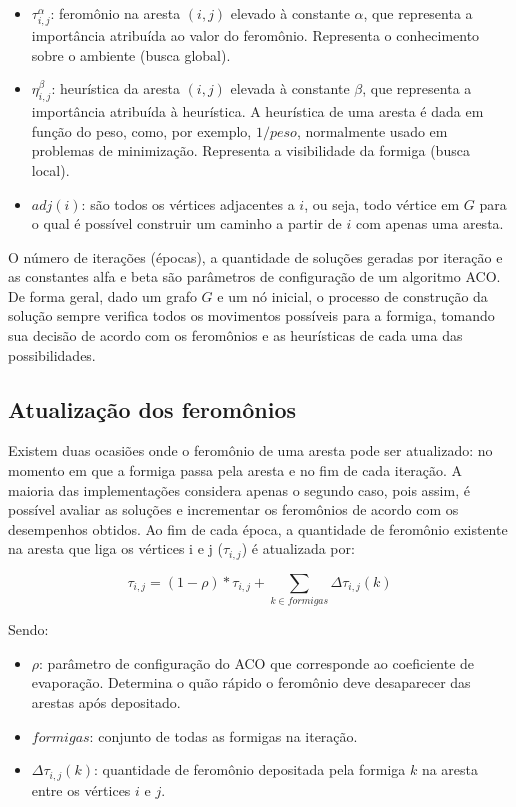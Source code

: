 \begin{itemize}  
	\item $\tau_{i,j}^\alpha$: feromônio na aresta $(i,j)$ elevado à constante $\alpha$, que representa a importância atribuída ao valor do feromônio. Representa o conhecimento sobre o ambiente (busca global).
	\item $\eta_{i,j}^\beta$: heurística da aresta $(i,j)$ elevada à constante $\beta$, que representa a importância atribuída à heurística. A heurística de uma aresta é dada em função do peso, como, por exemplo, $1/peso$, normalmente usado em problemas de minimização. Representa a visibilidade da formiga (busca local).
	\item $adj(i)$: são todos os vértices adjacentes a $i$, ou seja, todo vértice em $G$ para o qual é possível construir um caminho a partir de $i$ com apenas uma aresta.
\end{itemize}

O número de iterações (épocas), a quantidade de soluções geradas por iteração e as constantes alfa e beta são parâmetros de configuração de um algoritmo ACO. De forma geral, dado um grafo $G$ e um nó inicial, o processo de construção da solução sempre verifica todos os movimentos possíveis para a formiga, tomando sua decisão de acordo com os feromônios e as heurísticas de cada uma das possibilidades.

\subsection{Atualização dos feromônios}
Existem duas ocasiões onde o feromônio de uma aresta pode ser atualizado: no momento em que a formiga passa pela aresta e no fim de cada iteração. A maioria das implementações considera apenas o segundo caso, pois assim, é possível avaliar as soluções e incrementar os feromônios de acordo com os desempenhos obtidos. Ao fim de cada época, a quantidade de feromônio existente na aresta que liga os vértices i e j ($\tau_{i,j}$) é atualizada por:

\[ \tau_{i,j} = (1 - \rho) * \tau_{i,j} + \sum_{k \in formigas} \Delta\tau_{i,j}(k)\]

Sendo:

\begin{itemize}  
	\item $\rho$: parâmetro de configuração do ACO que corresponde ao coeficiente de evaporação. Determina o quão rápido o feromônio deve desaparecer das arestas após depositado.
	\item $formigas$: conjunto de todas as formigas na iteração.
	\item $\Delta\tau_{i,j}(k)$: quantidade de feromônio depositada pela formiga $k$ na aresta entre os vértices $i$ e $j$.
\end{itemize}

